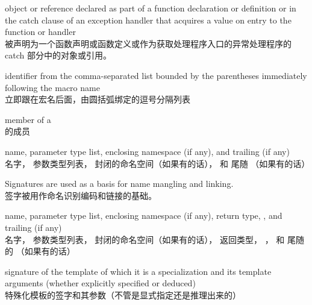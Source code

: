 %
%
%
 object or reference declared as part of a function declaration or
definition or in the catch clause of an exception handler that
acquires a value on entry to the function or handler \\
被声明为一个函数声明或函数定义或作为获取处理程序入口的异常处理程序的 catch 部分中的对象或引用。

%
%
 identifier from
the comma-separated list bounded by the parentheses immediately
following the macro name \\
立即跟在宏名后面，由圆括弧绑定的逗号分隔列表

%
%
 member of a  \\
 的成员

%
name,
parameter type list,
enclosing namespace (if any),
and
trailing  (if any) \\
名字，
参数类型列表，
封闭的命名空间（如果有的话），
和
尾随 （如果有的话）


\begin{defnote}
Signatures are used as a basis for
name mangling and linking. \\
签字被用作命名识别编码和链接的基础。
\end{defnote}

%
name,
parameter type list,
enclosing namespace (if any),
return type,
,
and
trailing  (if any) \\
名字，
参数类型列表，
封闭的命名空间（如果有的话），
返回类型，
，
和
尾随的 （如果有的话）

%
 signature of the template of which it is a specialization
and its template arguments (whether explicitly specified or deduced) \\
特殊化模板的签字和其参数（不管是显式指定还是推理出来的）

